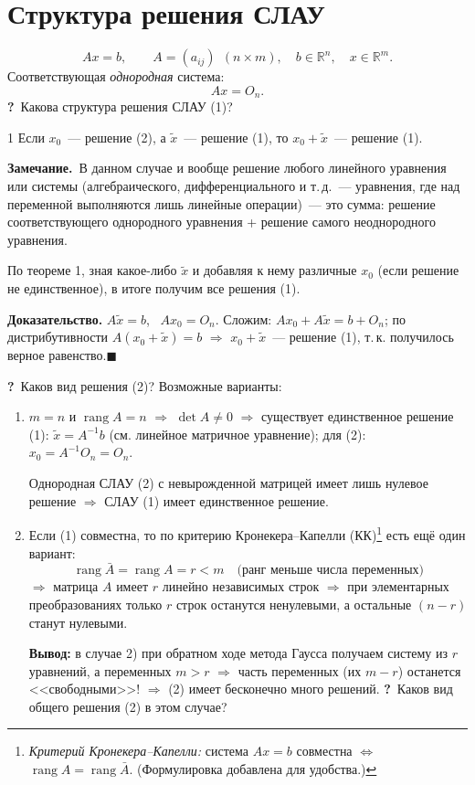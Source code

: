 \documentclass[a4paper,11pt]{article}
\newcommand{\q}{\textbf{\color{red!70!black}?}\ }
\newcommand{\zam}{\textbf{Замечание.}\ }
\newcommand{\qedr}{\hfill$\blacksquare$}
\newcommand{\rang}{\operatorname{rang}}
\begin{document}
\section{Структура решения СЛАУ}
\[
Ax=b,\qquad A=(a_{ij})\ \ (n\times m),\quad b\in\mathbb R^n,\quad x\in\mathbb R^m.\tag{1}
\]
Соответствующая \emph{однородная} система:
\[
Ax=O_n.\tag{2}
\]
\q Какова структура решения СЛАУ (1)?

\begin{teor}{1}
Если $x_0$~--- решение (2), а $\tilde x$~--- решение (1), то $x_0+\tilde x$~--- решение (1).
\end{teor}

\zam В данном случае и вообще решение любого линейного уравнения или системы (алгебраического,
дифференциального и т.\,д.~--- уравнения, где над переменной выполняются лишь линейные операции)~---
это сумма: решение соответствующего однородного уравнения + решение самого неоднородного уравнения.

По теореме 1, зная какое-либо $\tilde x$ и добавляя к нему различные $x_0$ (если решение не
единственное), в итоге получим все решения (1).

\textbf{Доказательство.} $A\tilde x=b$, \ $Ax_0=O_n$. Сложим: $Ax_0+A\tilde x=b+O_n$; по
дистрибутивности $A(x_0+\tilde x)=b$ $\Rightarrow$ $x_0+\tilde x$~--- решение (1), т.\,к. получилось
верное равенство.\qedr

\q Каков вид решения (2)? Возможные варианты:
\begin{enumerate}[label=\arabic*)]
\item $m=n$ и $\rang A=n$ $\Rightarrow$ $\det A\ne0$ $\Rightarrow$ существует единственное решение (1):
$\tilde x=A^{-1}b$ (см. линейное матричное уравнение); для (2): $x_0=A^{-1}O_n=O_n$.

Однородная СЛАУ (2) с невырожденной матрицей имеет лишь нулевое решение $\Rightarrow$ СЛАУ (1) имеет
единственное решение.
\item Если (1) совместна, то по критерию Кронекера--Капелли (КК)\footnote{\textit{Критерий
Кронекера--Капелли:} система $Ax=b$ совместна $\iff$ $\rang A=\rang\bar A$. (Формулировка добавлена
для удобства.)} есть ещё один вариант:
\[
\rang\bar A=\rang A=r<m\quad\text{(ранг меньше числа переменных)}
\]
$\Rightarrow$ матрица $A$ имеет $r$ линейно независимых строк $\Rightarrow$ при элементарных
преобразованиях только $r$ строк останутся ненулевыми, а остальные $(n-r)$ станут нулевыми.

\textbf{Вывод:} в случае 2) при обратном ходе метода Гаусса получаем систему из $r$ уравнений,
а переменных $m>r$ $\Rightarrow$ часть переменных (их $m-r$) останется <<свободными>>!
$\Rightarrow$ (2) имеет бесконечно много решений.
\q Каков вид общего решения (2) в этом случае?
\end{enumerate}
\end{document}

